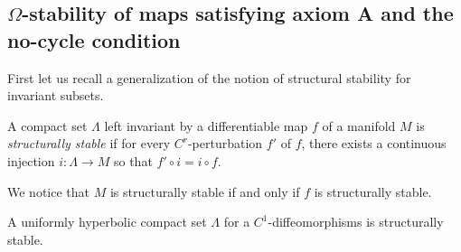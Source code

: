 \documentclass[11pt,openany,leqno]{article}
\begin{document}
\subsection{$\Omega$-stability of maps satisfying axiom A and the no-cycle condition}
\label{hypimpliesstab1}
First let us recall a generalization of the notion of structural stability for invariant subsets. 
\begin{defi} A compact set $\Lambda$ left invariant by a differentiable map $f$ of a manifold $M$ is \emph{structurally stable} if for every $C^r$-perturbation $f'$ of $f$, there exists a continuous injection $i\colon \Lambda \to M$ so that 
$f'\circ i = i\circ f$.
\end{defi}
We notice that $M$ is structurally stable if and only if $f$ is structurally stable. 
\begin{thm}   \label{anosovthm}
A  uniformly hyperbolic compact set $\Lambda$ for a $C^1$-diffeomorphisms is structurally stable.
\end{thm}
\end{document}
